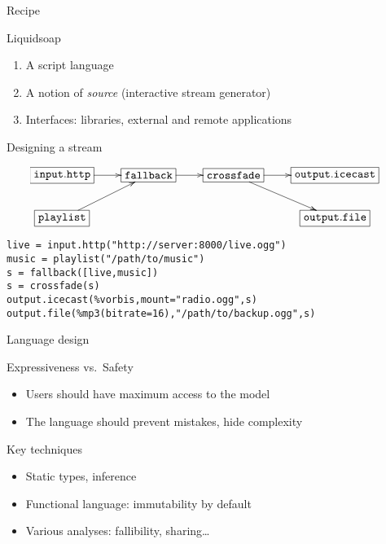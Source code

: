 \documentclass{beamer}
\begin{document}

\begin{frame}{Recipe}

\begin{block}{Liquidsoap}
\begin{enumerate}
\item<3-> A script language
\item<2-> A notion of {\em source} (interactive stream generator)
\item<1-> Interfaces: libraries, external and remote applications
\end{enumerate}
\end{block}

\end{frame}


\begin{frame}[fragile]{Designing a stream}

\[
\hspace{-0.4cm}\xymatrix{
  *+[F]{\mathtt{input.http}} \ar[r] &
     *+[F]{\mathtt{fallback}}\ar[r] &
     *+[F]{\mathtt{crossfade}} \ar[r]\ar[dr] &
     *+[F]{\mathtt{output.icecast}} \\
  *+[F]{\mathtt{playlist}}\ar[ur] & & &
     *+[F]{\mathtt{output.file}}\\
}
\]

\vfill
\pause

\begin{lstlisting}
live = input.http("http://server:8000/live.ogg")
music = playlist("/path/to/music")
s = fallback([live,music])
s = crossfade(s)
output.icecast(%vorbis,mount="radio.ogg",s)
output.file(%mp3(bitrate=16),"/path/to/backup.ogg",s)
\end{lstlisting}

\end{frame}


\begin{frame}{Language design}

\begin{block}{Expressiveness vs.~Safety}
\begin{itemize}
\item Users should have maximum access to the model
\item The language should prevent mistakes, hide complexity
\end{itemize}
\end{block}

\begin{block}{Key techniques}
\begin{itemize}
\item Static types, inference
\item Functional language: immutability by default
\item Various analyses: fallibility, sharing\ldots
\end{itemize}
\end{block}

\end{frame}
\end{document}
